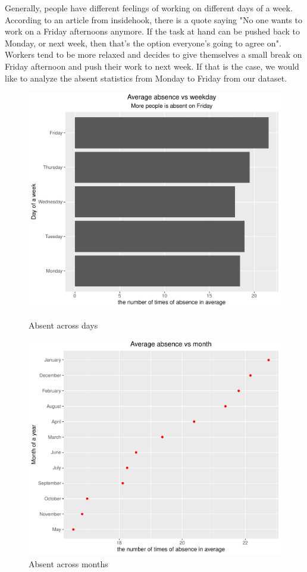 \documentclass{article}
\begin{document}
Generally, people have different feelings of working on different days of a week. According to an article from insidehook, there is a quote saying "No one wants to work on a Friday afternoons anymore. If the task at hand can be pushed back to Monday, or next week, then that’s the option everyone’s going to agree on". Workers tend to be more relaxed and decides to give themselves a small break on Friday afternoon and push their work to next week. If that is the case, we would like to analyze the absent statistics from Monday to Friday from our dataset.
\begin{figure}[h]
 \centering
 \begin{minipage}[b]{.4\textwidth}
  \includegraphics[width=1\linewidth]{absent_workday.pdf}
  \caption{Absent across days}
 \end{minipage}
 \begin{minipage}[b]{.4\textwidth}
  \includegraphics[width=1\linewidth]{absent_month.pdf}
  \caption{Absent across months}
 \end{minipage}
\end{figure}
\end{document}
